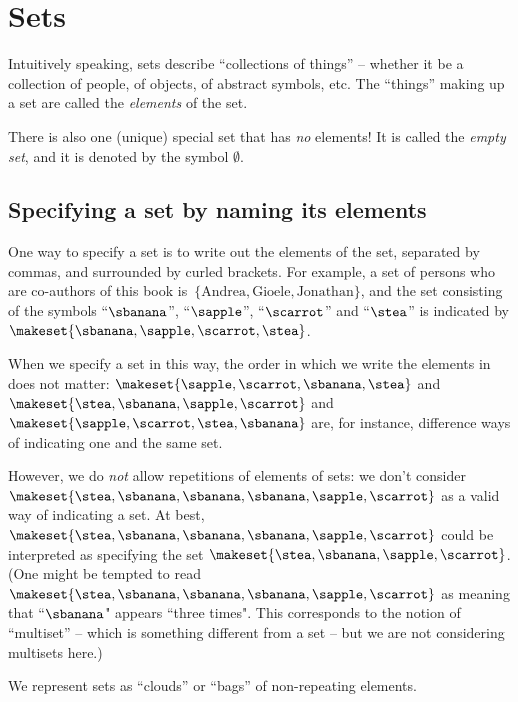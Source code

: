 
\section{Sets}

Intuitively speaking, sets describe ``collections of things'' -- whether it be a collection of people, of objects, of abstract symbols, etc.
The ``things'' making up a set are called the \emph{elements} of the set.

There is also one (unique) special set that has \emph{no} elements!
It is called the \emph{empty set}, and it is denoted by the symbol $\emptyset$.

\subsection{Specifying a set by naming its elements}

One way to specify a set is to write out the elements of the set, separated by commas, and surrounded by curled brackets.
For example, a set of persons who are co-authors of this book is~$\{ \text{Andrea}, \text{Gioele}, \text{Jonathan} \}$, and the set consisting of the symbols ``$\sbanana$'', ``$\sapple$'', ``$\scarrot$'' and ``$\stea$'' is indicated by $\makeset{ \sbanana, \sapple, \scarrot, \stea}$.

When we specify a set in this way, the order in which we write the elements in does not matter:
$\makeset{ \sapple, \scarrot, \sbanana, \stea}$ and~$\makeset{ \stea, \sbanana, \sapple, \scarrot}$ and~$\makeset{ \sapple, \scarrot, \stea, \sbanana}$ are, for instance, difference ways of indicating one and the same set.

However, we do \emph{not} allow repetitions of elements of sets: we don't consider
$\makeset{ \stea, \sbanana, \sbanana, \sbanana, \sapple, \scarrot }$ as a valid way of indicating a set.
At best, $\makeset{ \stea, \sbanana, \sbanana, \sbanana, \sapple, \scarrot }$ could be interpreted as specifying the set $\makeset{ \stea, \sbanana, \sapple, \scarrot }$.
(One might be tempted to read $\makeset{ \stea, \sbanana, \sbanana, \sbanana, \sapple, \scarrot }$ as meaning that ``$\sbanana$" appears ``three times".
This corresponds to the notion of ``multiset'' -- which is something different from a set -- but we are not considering multisets here.)

\begin{marginfigure}
    \centering
    \caption{We represent sets as ``clouds'' or ``bags'' of non-repeating elements.}
    \label{fig:set_as_clouds}
\end{marginfigure}

